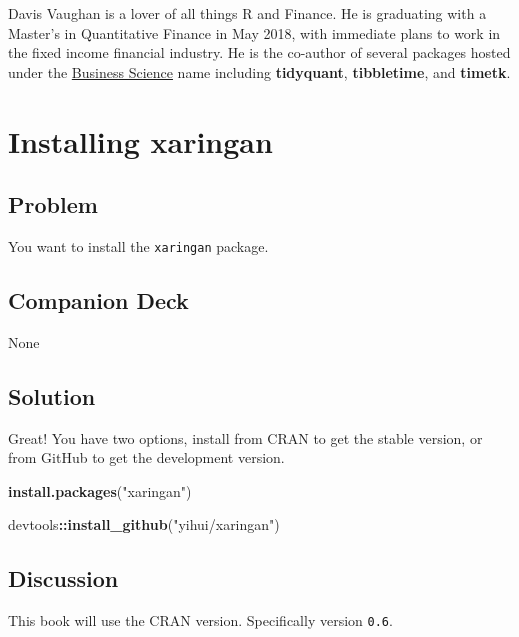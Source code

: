 \documentclass[]{book}
\newenvironment{Shaded}{\begin{snugshade}}{\end{snugshade}}
\newcommand{\KeywordTok}[1]{\textcolor[rgb]{0.13,0.29,0.53}{\textbf{#1}}}
\newcommand{\NormalTok}[1]{#1}
\newcommand{\OperatorTok}[1]{\textcolor[rgb]{0.81,0.36,0.00}{\textbf{#1}}}
\newcommand{\StringTok}[1]{\textcolor[rgb]{0.31,0.60,0.02}{#1}}
\theoremstyle{definition}
\theoremstyle{definition}
\theoremstyle{definition}
\theoremstyle{remark}
\begin{document}
Davis Vaughan is a lover of all things R and Finance. He is graduating
with a Master's in Quantitative Finance in May 2018, with immediate
plans to work in the fixed income financial industry. He is the
co-author of several packages hosted under the
\href{http://www.business-science.io/}{Business Science} name including
\textbf{tidyquant}, \textbf{tibbletime}, and \textbf{timetk}.

\hypertarget{installing-xaringan}{%
\chapter{Installing xaringan}\label{installing-xaringan}}

\hypertarget{problem}{%
\section{Problem}\label{problem}}

You want to install the \texttt{xaringan} package.

\hypertarget{companion-deck}{%
\section{Companion Deck}\label{companion-deck}}

None

\hypertarget{solution}{%
\section{Solution}\label{solution}}

Great! You have two options, install from CRAN to get the stable
version, or from GitHub to get the development version.

\begin{Shaded}
\begin{Highlighting}[]
\KeywordTok{install.packages}\NormalTok{(}\StringTok{"xaringan"}\NormalTok{)}

\NormalTok{devtools}\OperatorTok{::}\KeywordTok{install_github}\NormalTok{(}\StringTok{"yihui/xaringan"}\NormalTok{)}
\end{Highlighting}
\end{Shaded}

\hypertarget{discussion}{%
\section{Discussion}\label{discussion}}

This book will use the CRAN version. Specifically version \texttt{0.6}.
\end{document}
